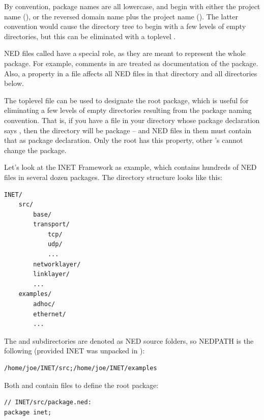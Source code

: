 By convention, package names are all lowercase, and begin with either
the project name (), or the reversed domain name plus the
project name (). The latter convention
would cause the directory tree to begin with a few levels of empty
directories, but this can be eliminated with a toplevel .

NED files called  have a special role, as they are meant
to represent the whole package. For example, comments in
 are treated as documentation of the package. Also, a
 property in a  file affects all NED
files in that directory and all directories below.

The toplevel  file can be used to designate the root
package, which is useful for eliminating a few levels of empty directories
resulting from the package naming convention. That is, if you have a
 file in your  directory whose package
declaration says , then the 
directory will be package  -- and NED
files in them must contain that as package declaration. Only the root
 has this property, other 's cannot
change the package.

Let's look at the INET Framework as example, which contains hundreds of NED
files in several dozen packages. The directory structure looks like this:

\begin{Verbatim}
INET/
    src/
        base/
        transport/
            tcp/
            udp/
            ...
        networklayer/
        linklayer/
        ...
    examples/
        adhoc/
        ethernet/
        ...
\end{Verbatim}

The  and  subdirectories are denoted as NED source
folders, so NEDPATH is the following (provided INET was unpacked in
):

\begin{Verbatim}
/home/joe/INET/src;/home/joe/INET/examples
\end{Verbatim}

Both  and  contain  files to
define the root package:

\begin{Verbatim}
// INET/src/package.ned:
package inet;
\end{Verbatim}

